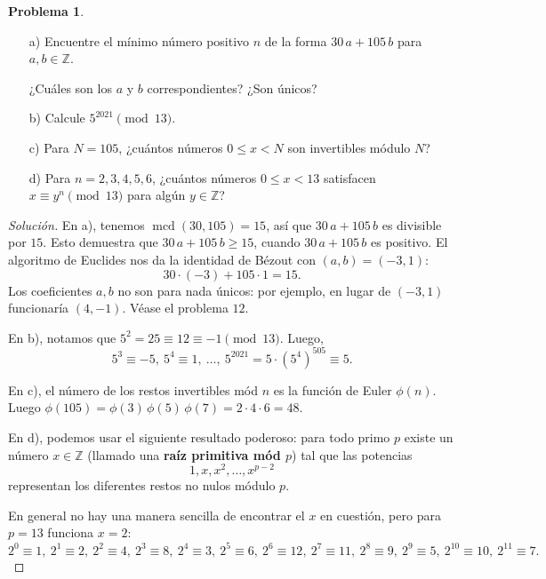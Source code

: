 \documentclass{article}
\newcommand{\ZZ}{\mathbb{Z}}
\DeclareMathOperator{\mcd}{mcd}
\theoremstyle{definition}
\newtheorem{problema}{Problema}
\newenvironment{solucion}{\begin{proof}[Solución]}{\end{proof}}
\begin{document}
\setcounter{problema}{-1}
\begin{problema}
  ~
  \begin{enumerate}
  \item[a)] Encuentre el mínimo número positivo $n$ de la forma $30\,a + 105\,b$
    para $a,b \in \ZZ$.

    ¿Cuáles son los $a$ y $b$ correspondientes? ¿Son únicos?

  \item[b)] Calcule $5^{2021} \pmod{13}$.

  \item[c)] Para $N = 105$, ¿cuántos números $0 \le x < N$ son invertibles
    módulo $N$?

  \item[d)] Para $n = 2,3,4,5,6$, ¿cuántos números $0 \le x < 13$ satisfacen
    $x \equiv y^n \pmod{13}$ para algún $y \in \ZZ$?
  \end{enumerate}

  \ifdefined\solutions\begin{solucion}
    En a), tenemos $\mcd (30,105) = 15$, así que $30\,a + 105\,b$ es divisible
    por $15$. Esto demuestra que $30\,a + 105\,b \ge 15$, cuando $30\,a + 105\,b$
    es positivo. El algoritmo de Euclides nos da la identidad de Bézout con
    $(a,b) = (-3,1)$:
    $$30\cdot (-3) + 105\cdot 1 = 15.$$
    Los coeficientes $a,b$ no son para nada únicos: por ejemplo, en lugar de
    $(-3,1)$ funcionaría $(4,-1)$. Véase el problema $12$.

    \vspace{1em}

    En b), notamos que $5^2 = 25 \equiv 12 \equiv -1 \pmod{13}$. Luego,
    \[
      5^3 \equiv -5, ~
      5^4 \equiv 1, ~
      \ldots, ~
      5^{2021} = 5\cdot (5^4)^{505} \equiv 5.
    \]

    En c), el número de los restos invertibles mód $n$ es la función de Euler
    $\phi(n)$. Luego
    $\phi (105) = \phi(3)\,\phi(5)\,\phi(7) = 2\cdot 4\cdot 6 = 48$.

    \vspace{1em}

    En d), podemos usar el siguiente resultado poderoso: para todo primo $p$
    existe un número $x \in \ZZ$ (llamado una \textbf{raíz primitiva mód $p$})
    tal que las potencias
    $$1, x, x^2, \ldots, x^{p-2}$$
    representan los diferentes restos no nulos módulo $p$.

    En general no hay una manera sencilla de encontrar el $x$ en cuestión, pero
    para $p = 13$ funciona $x = 2$:
    \[
      2^0 \equiv 1, ~
      2^1 \equiv 2, ~
      2^2 \equiv 4, ~
      2^3 \equiv 8, ~
      2^4 \equiv 3, ~
      2^5 \equiv 6, ~
      2^6 \equiv 12, ~
      2^7 \equiv 11, ~
      2^8 \equiv 9, ~
      2^9 \equiv 5, ~
      2^{10} \equiv 10, ~
      2^{11} \equiv 7.
    \]


\end{solucion}
\end{problema}
\end{document}
